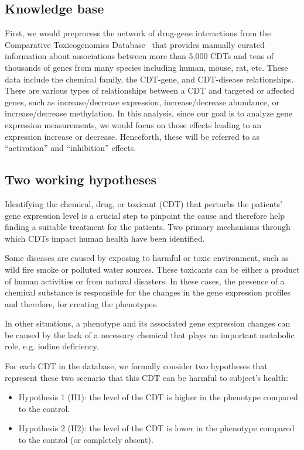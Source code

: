 \documentclass[Minh_PhD_thesis.tex]{subfiles}
\begin{document}
\subsection{Knowledge base}
First, we would preprocess the network of drug-gene interactions from the Comparative Toxicogenomics Database~\cite{mattingly2006comparative} that provides manually curated information about associations between more than 5,000 CDTs and tens of thousands of genes from many species including human, mouse, rat, etc. These data include the chemical family, the CDT-gene, and CDT-disease relationships.
There are various types of relationships between a CDT and targeted or affected genes, such as increase/decrease expression, increase/decrease abundance, or increase/decrease methylation.
In this analysis, since our goal is to analyze gene expression measurements, we would focus on  those effects leading to an expression increase or decrease. Henceforth, these will be referred to as ``activation'' and ``inhibition'' effects.



\subsection{Two working hypotheses}

Identifying the chemical, drug, or toxicant (CDT) that perturbs the patients' gene expression level is a crucial step to pinpoint the cause and therefore help finding a suitable treatment for the patients. Two primary mechanisms through which CDTs impact human health have been identified.

Some diseases are caused by exposing to harmful or toxic environment, such as wild fire smoke or polluted water sources. These toxicants can be either a product of human activities or from natural disasters. In these cases, the presence of a chemical substance  is responsible for the changes in  the gene expression profiles and  therefore, for creating the phenotypes. 

In other situations,  a phenotype and its associated  gene expression changes  can be caused by the lack of a necessary chemical  that plays an important metabolic role, e.g. iodine deficiency. 

For each CDT in the database, we formally consider two hypotheses that represent these two scenario that this CDT can be harmful to subject's health:

\begin{itemize}
\item Hypothesis 1 (H1): the level of the CDT is higher in the phenotype compared to the control.%
\item Hypothesis 2 (H2): the level of the CDT  is lower  in the phenotype compared to the control (or completely absent).%
\end{itemize}
\end{document}
